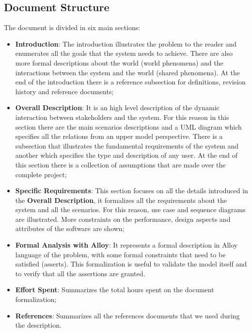 \subsection{Document Structure}
The document is divided in six main sections:
\begin{itemize}
    \item \textbf{Introduction}: The introduction illustrates the problem to the reader and enumerates all the goals that
          the system needs to achieve. There are also more formal descriptions about the world (world phenomena) and the
          interactions between the system and the world (shared phenomena). At the end of the introduction there is a reference subsection for definitions, revision history and reference documents;
    \item \textbf{Overall Description}: It is an high level description of the dynamic interaction between stakeholders and the system. For this reason in this section there are
          the main scenarios descriptions and a UML diagram which specifies all the relations from an upper model perspective. There is a subsection that illustrates
          the fundamental requirements of the system and another which specifies the type and description of any user. At the end of this section there is a collection of assumptions that are made over the complete project;
    \item \textbf{Specific Requirements}: This section focuses on all the details introduced in the \textbf{Overall Description}, it formalizes all the requirements
          about the system and all the scenarios. For this reason, use case and sequence diagrams are illustrated. More constraints on the performance, design aspects and attributes of the software are shown;
    \item \textbf{Formal Analysis with Alloy}: It represents a formal description in Alloy language of the problem, with some formal constraints that need to be satisfied (asserts).
          This formalization is useful to validate the model itself and to verify that all the assertions are granted.
    \item \textbf{Effort Spent}: Summarizes the total hours spent on the document formalization;
    \item \textbf{References}: Summarizes all the references documents that we used during the description.
\end{itemize}



\clearpage